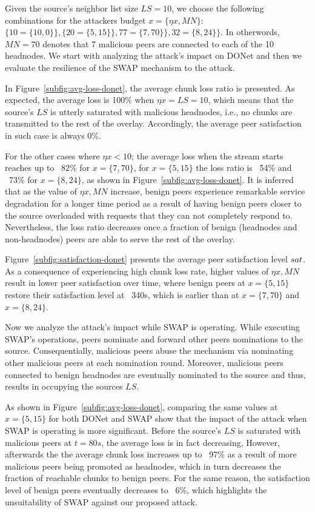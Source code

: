 Given the source's neighbor list size $LS=10$, we choose the following combinations for the attackers budget $x={\{\eta x, MN\}}$: $\{10=\{10,0\}\}, \{20=\{5,15\}\}, 77=\{7,70\}\}, 32=\{8,24\}\}$.
In otherwords, $MN=70$ denotes that 7 malicious peers are connected to each of the 10 headnodes.
We start with analyzing the attack's impact on DONet and then we evaluate the resilience of the SWAP mechanism to the attack.

In Figure~\ref{subfig:avg-loss-donet}, the average chunk loss ratio is presented. 
As expected, the average loss is 100\% when $\eta x= LS =10$, which means that the source's $LS$ is utterly saturated with malicious headnodes, i.e., no chunks are transmitted to the rest of the overlay.
Accordingly, the average peer satisfaction in such case is always 0\%. 

For the other cases where $\eta x < 10$; the average loss when the stream starts reaches up to ~82\% for $x=\{7, 70\}$, for $x=\{5, 15\}$ the loss ratio is ~54\% and ~73\% for $x=\{8, 24\}$, as shown in Figure~\ref{subfig:avg-loss-donet}.
It is inferred that as the value of $\eta x, MN$ increase, benign peers experience remarkable service degradation for a longer time period as a result of having benign peers closer to the source overloaded with requests that they can not completely respond to. 
Nevertheless, the loss ratio decreases once a fraction of benign (headnodes and non-headnodes) peers are able to serve the rest of the overlay.

Figure~\ref{subfig:satisfaction-donet} presents the average peer satisfaction level $sat$.
As a consequence of experiencing high chunk loss rate, higher values of $\eta x, MN$ result in lower peer satisfaction over time, where benign peers at $x=\{5, 15\}$ restore their satisfaction level at ~340s, which is earlier than at $x=\{7, 70\}$ and $x=\{8, 24\}$.

Now we analyze the attack's impact while SWAP is operating.
While executing SWAP's operations, peers nominate and forward other peers nominations to the source. 
Consequentially, malicious peers abuse the mechanism via nominating other malicious peers at each nomination round. 
Moreover, malicious peers connected to benign headnodes are eventually nominated to the source and thus, results in occupying the sources $LS$.

As shown in Figure~\ref{subfig:avg-loss-donet}, comparing the same values at $x=\{5, 15\}$ for both DONet and SWAP show that the impact of the attack when SWAP is operating is more significant.
Before the source's $LS$ is saturated with malicious peers at $t=80s$, the average loss is in fact decreasing, However, afterwards the the average chunk loss increases up to ~97\% as a result of more malicious peers being promoted as headnodes, which in turn decreases the fraction of reachable chunks to benign peers.
For the same reason, the satisfaction level of benign peers eventually decreases to ~6\%, which highlights the unsuitability of SWAP against our proposed attack.


